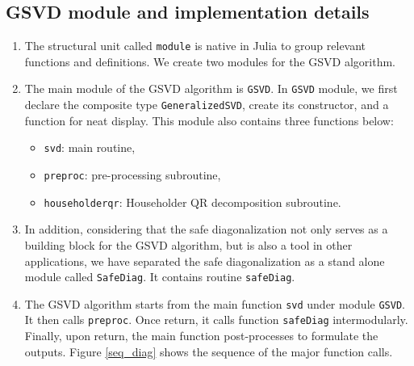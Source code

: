 \subsection{GSVD module and implementation details}
\begin{enumerate} 
\item 
The structural unit called \texttt{module} is native in Julia to 
group relevant functions and definitions. We create two modules
for the GSVD algorithm. 

\item 
The main module of the GSVD algorithm is \texttt{GSVD}. In {\tt GSVD}
module, we first declare the composite type {\tt GeneralizedSVD}, create its constructor,
and a function for neat display.
This module also contains three functions below:
	\begin{itemize}
		\item {\tt svd}: main routine,
		\item {\tt preproc}: pre-processing subroutine,
		\item {\tt householderqr}: Householder QR decomposition subroutine.
	\end{itemize}
	
\item 
In addition, considering that the safe diagonalization not only serves 
as a building block for the GSVD algorithm, but is also a 
tool in other applications, we have separated the safe diagonalization 
as a stand alone module called \texttt{SafeDiag}. It contains routine {\tt safeDiag}.

\item 
The GSVD algorithm starts from the main function \texttt{svd} 
under module \texttt{GSVD}. It then calls \texttt{preproc}. 
Once return, it calls function \texttt{safeDiag} intermodularly. 
Finally, upon return, the main function post-processes to 
formulate the outputs. Figure \ref{seq_diag} shows the sequence of the major function 
calls.


\end{enumerate}
